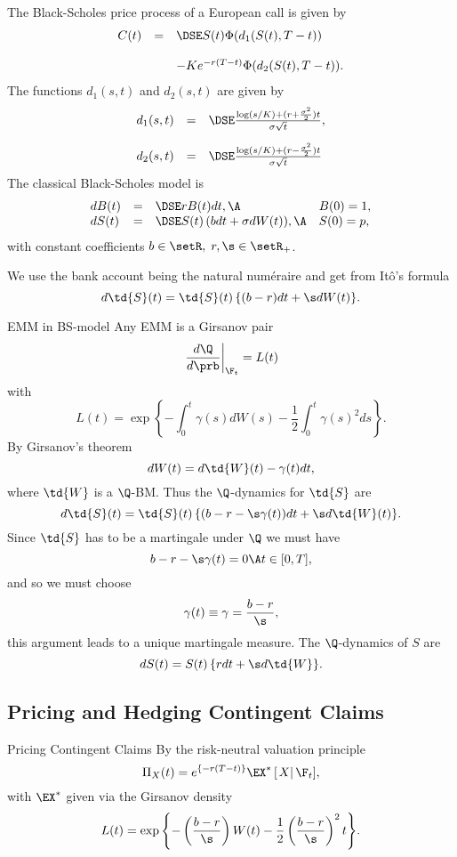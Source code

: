 	The Black-Scholes price pro\-cess of a European call is given by
		$$
		\begin{array}{lll}
		C(t) &=&\DSE S(t) \Phi(d_1(S(t), T-t))\\*[12pt] &&- K e^{-r(T-t)}
		\Phi(d_2(S(t), T-t)).
		\end{array}
		$$
	The functions $d_1(s,t)$ and $d_2(s,t)$ are given by
		$$
		\begin{array}{lll}
		d_1(s,t) &=&\DSE \frac{\log(s/K) + (r +
		\frac{\sigma^2}{2})t}{\sigma \sqrt{t}},\\*[12pt] d_2(s,t) &=&\DSE
		 \frac{\log(s/K) + (r -
		\frac{\sigma^2}{2})t}{\sigma \sqrt{t}}
		\end{array}
		$$
	The classical Black-Scholes model is
		$$
		\begin{array}{llll}
		dB(t) &=&\DSE r B(t) dt, \A &B(0)= 1,\\ dS(t) &=&\DSE S(t) \left(
		b dt + \sigma dW(t) \right)\!, \A &S(0) = p,
		\end{array}
		$$
	with constant coefficients $b \in \setR,\; r,\s \in \setR_+$.

	We use the bank account being the natural num\'{e}raire and get
	from It\^{o}'s formula
		$$
		d\td{S}(t) = \td{S}(t)\left\{ (b-r) dt + \s dW(t) \right\}\!.
		$$


EMM in BS-model
	Any EMM is a Girsanov pair
		$$
		\left.\frac{d\Q}{d\prb}\right|_{\F_t} =L(t)
		$$
	with
		$$
		L(t) = \exp\left\{- \int_0^t \gamma(s) dW(s) - \frac{1}{2}
		\int_0^t \gamma(s)^2 ds\right\}.
		$$
	By Girsanov's theorem
		$$
		dW(t) =  d\td{W}(t) - \gamma(t) dt,
		$$
	where $\td{W}$ is a $\Q$-BM. Thus the $\Q$-dynamics for $\td{S}$ are
		$$
		d\td{S}(t) = \td{S}(t)\left\{ (b-r - \s \gamma(t)) dt + \s
		d\td{W}(t) \right\}\!.
		$$
	Since $\td{S}$ has to be a martingale under $\Q$ we must have
		$$
		b-r - \s \gamma(t)= 0\A t \in [0,T],
		$$
	and so we must choose
		$$
		\gamma(t) \equiv \gamma = \frac{b-r}{\s},
		$$
	this argument leads to a unique martingale measure. The $\Q$-dynamics of $S$ are
		$$
		dS(t) = S(t) \left\{ r dt + \s d\td{W} \right\}\!.
		$$


\subsection{Pricing and Hedging Contingent Claims}

Pricing Contingent Claims
	By the risk-neutral valuation principle
		$$
		\Pi_X(t) = e^{\left\{ -r (T-t)\right\}} \EX^*\left[\left.X
		\right|\F_t\right]\!,
		$$
	with $\EX^*$ given via the Girsanov density
		$$
		L(t)=\exp\left\{ -\left(\frac{b-r}{\s}\right) W(t) - \frac{1}{2}
		\left(\frac{b-r}{\s}\right)^2 t \right\}\!.
		$$


